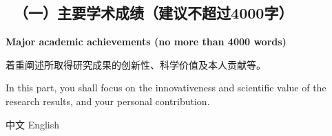 
{\color{MsBlue} \subsection{\sihao \kaishu \quad \ 
\textbf{（一）主要学术成绩}（建议不超过4000字）}}

{\color{MsBlue} \xiaosihao {} 
\textbf{Major academic achievements (no more than 4000 words)}}

{\sihao \kaishu \color{MsBlue} 着重阐述所取得研究成果的创新性、科学价值及本人贡献等。}

{\color{MsBlue} \xiaosihao {} In this part, you shall 
focus on the innovativeness and scientific value of the research results, 
and your personal contribution.}

中文 English



